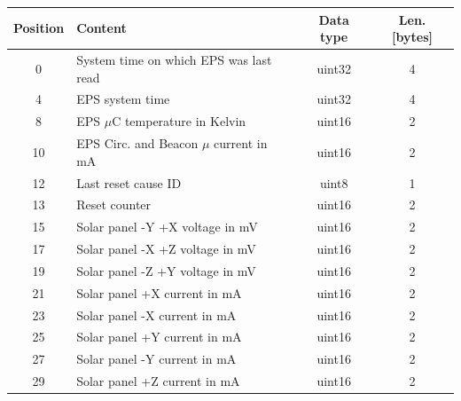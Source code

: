 \begin{table}[!ht]
	\centering
    \small
	\begin{tabular}{clcc}
		\toprule[1.5pt]
		\textbf{Position}   & \textbf{Content}                                  & \textbf{Data type} & \textbf{Len. [bytes]} \\
		\midrule                                                                                                          
		0                   & System time on which EPS was last read            & uint32             & 4                     \\
		4                   & EPS system time                                   & uint32             & 4                     \\
		8                   & EPS $\mu$C temperature in Kelvin                  & uint16             & 2                     \\
		10                  & EPS Circ. and Beacon $\mu$ current in mA          & uint16             & 2                     \\
		12                  & Last reset cause ID                               & uint8              & 1                     \\
		13                  & Reset counter                                     & uint16             & 2                     \\
		15                  & Solar panel -Y +X voltage in mV                   & uint16             & 2                     \\
		17                  & Solar panel -X +Z voltage in mV                   & uint16             & 2                     \\
		19                  & Solar panel -Z +Y voltage in mV                   & uint16             & 2                     \\
		21                  & Solar panel +X current in mA                      & uint16             & 2                     \\
		23                  & Solar panel -X current in mA                      & uint16             & 2                     \\
        25                  & Solar panel +Y current in mA                      & uint16             & 2                     \\
        27                  & Solar panel -Y current in mA                      & uint16             & 2                     \\
		29                  & Solar panel +Z current in mA                      & uint16             & 2                     \\

\end{tabular}
\end{table}
